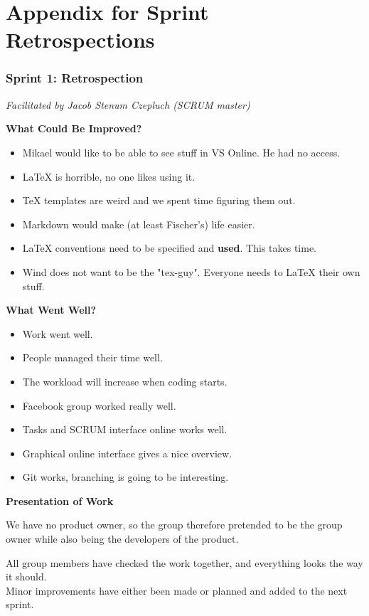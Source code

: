 \section{Appendix for Sprint Retrospections}
\label{sec:scrum-sprints}
\subsubsection{Sprint 1: Retrospection}
\label{sec:sprint1}
\small{\textit{Facilitated by Jacob Stenum Czepluch (SCRUM master)}} 

\textbf{What Could Be Improved?}

\begin{itemize}
	\item Mikael would like to be able to see stuff in VS Online. He had no access.
	\item LaTeX is horrible, no one likes using it.
	\item TeX templates are weird and we spent time figuring them out.
	\item Markdown would make (at least Fischer's) life easier. 
	\item LaTeX conventions need to be specified and \textbf{used}. This takes time.
	\item Wind does not want to be the "tex-guy". Everyone needs to LaTeX their own stuff.
\end{itemize}

\textbf{What Went Well?}

\begin{itemize}
	\item Work went well. 
	\item People managed their time well.
	\item The workload will increase when coding starts.
	\item Facebook group worked really well.
	\item Tasks and SCRUM interface online works well.
	\item Graphical online interface gives a nice overview.
	\item Git works, branching is going to be interesting. 
\end{itemize}

\textbf{Presentation of Work}

We have no product owner, so the group therefore pretended to be the group owner while also being the developers of the product. 

All group members have checked the work together, and everything looks the way it should. \\
Minor improvements have either been made or planned and added to the next sprint. 


